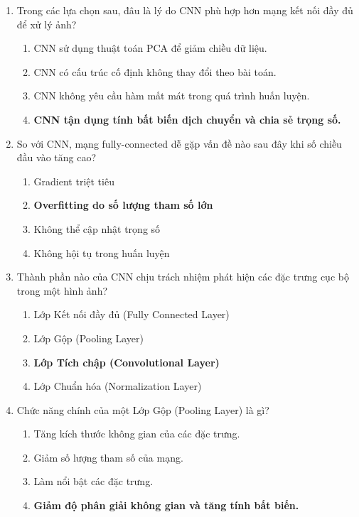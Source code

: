 \documentclass{book}
\begin{document}
\begin{enumerate}
    \item Trong các lựa chọn sau, đâu là lý do CNN phù hợp hơn mạng kết nối đầy đủ để xử lý ảnh?
    \begin{multicols}{2}
        \begin{enumerate}[label=\Alph*]
            \item CNN sử dụng thuật toán PCA để giảm chiều dữ liệu.
            \item CNN có cấu trúc cố định không thay đổi theo bài toán.
            \item CNN không yêu cầu hàm mất mát trong quá trình huấn luyện.
            \item \textbf{CNN tận dụng tính bất biến dịch chuyển và chia sẻ trọng số.}
        \end{enumerate}
    \end{multicols}
    \item So với CNN, mạng fully-connected dễ gặp vấn đề nào sau đây khi số chiều đầu vào tăng cao?
    \begin{multicols}{2}
        \begin{enumerate}[label=\Alph*]
            \item Gradient triệt tiêu
            \item \textbf{Overfitting do số lượng tham số lớn}
            \item Không thể cập nhật trọng số
            \item Không hội tụ trong huấn luyện
        \end{enumerate}
    \end{multicols}
    \item Thành phần nào của CNN chịu trách nhiệm phát hiện các đặc trưng cục bộ trong một hình ảnh?
    \begin{multicols}{2}
        \begin{enumerate}[label=\Alph*]
            \item Lớp Kết nối đầy đủ (Fully Connected Layer)
            \item Lớp Gộp (Pooling Layer)
            \item \textbf{Lớp Tích chập (Convolutional Layer)}
            \item Lớp Chuẩn hóa (Normalization Layer)
        \end{enumerate}
    \end{multicols}

    \item Chức năng chính của một Lớp Gộp (Pooling Layer) là gì?
    \begin{multicols}{2}
        \begin{enumerate}[label=\Alph*]
            \item Tăng kích thước không gian của các đặc trưng.
            \item Giảm số lượng tham số của mạng.
            \item Làm nổi bật các đặc trưng.
            \item \textbf{Giảm độ phân giải không gian và tăng tính bất biến.}
        \end{enumerate}
    \end{multicols}


\end{enumerate}
\end{document}
